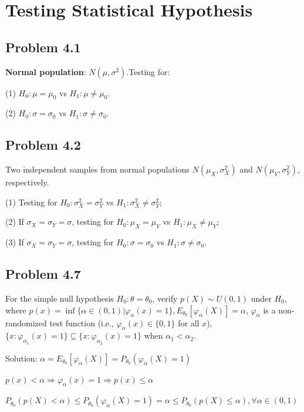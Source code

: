 \section{Testing Statistical Hypothesis}
\subsection*{Problem 4.1}

\textbf{Normal population}: \( N(\mu, \sigma^2) \).Testing for:

(1) \( H_0 : \mu = \mu_0 \) vs \( H_1 : \mu \neq \mu_0 \).

(2) \( H_0 : \sigma = \sigma_0 \) vs \( H_1 : \sigma \neq \sigma_0 \).

\subsection*{Problem 4.2}

Two independent samples from normal populations \( N(\mu_X, \sigma_X^2) \) and \( N(\mu_Y, \sigma_Y^2) \), respectively.

(1) Testing for \( H_0 : \sigma_X^2 = \sigma_Y^2 \) vs \( H_1 : \sigma_X^2 \neq \sigma_Y^2 \);

(2) If \( \sigma_X = \sigma_Y = \sigma \), testing for \( H_0 : \mu_X = \mu_Y \) vs \( H_1 : \mu_X \neq \mu_Y \);

(3) If \( \sigma_X = \sigma_Y = \sigma \), testing for \( H_0 : \sigma = \sigma_0 \) vs \( H_1 : \sigma \neq \sigma_0 \).

\subsection*{Problem 4.7}
For the simple null hypothesis $H_0:\theta=\theta_0$, verify $p(X)\sim U(0,1)$ under $H_0$, where $p(x) = \inf\{\alpha\in(0,1)|\varphi_{\alpha}(x)=1\},E_{\theta_0}[\varphi_{\alpha}(X)]=\alpha$, \(\varphi_\alpha\) is a non-randomized test function (i.e., \(\varphi_\alpha(x) \in \{0,1\}\) for all \(x\)),\(\{x : \varphi_{\alpha_1}(x) = 1\} \subseteq \{x : \varphi_{\alpha_2}(x) = 1\}\) when \(\alpha_1 < \alpha_2\).

{Solution:}
$\alpha=E_{\theta_0}[\varphi_{\alpha}(X)]=P_{\theta_0}(\varphi_{\alpha}(X)=1)$

$p(x)< \alpha \Rightarrow \varphi_{\alpha}(x)=1 \Rightarrow p(x)\leq \alpha$

$P_{\theta_0}(p(X)< \alpha)\leq P_{\theta_0}(\varphi_{\alpha}(X)=1)=\alpha \leq P_{\theta_0}(p(X)\leq \alpha),\forall \alpha\in(0,1)$

